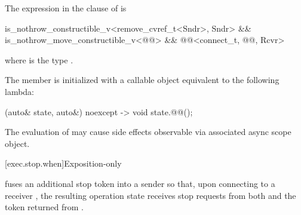 \pnum
The expression in the  clause of
 is
\begin{codeblock}
is_nothrow_constructible_v<remove_cvref_t<Sndr>, Sndr> &&
is_nothrow_move_constructible_v<@@> &&
@@<connect_t, @@, Rcvr>
\end{codeblock}
where  is the type
.

\pnum
The member 
is initialized with a callable object equivalent to the following lambda:
\begin{codeblock}
[](auto& state, auto&) noexcept -> void {
  state.@@();
}
\end{codeblock}

\pnum
The evaluation of 
may cause side effects observable
via  associated async scope object.

[exec.stop.when]{Exposition-only }

\pnum
 fuses an additional stop token 
into a sender so that, upon connecting to a receiver ,
the resulting operation state receives stop requests from both
 and the token returned from .

